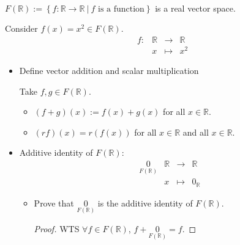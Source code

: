 \documentclass[11pt,fleqn]{book} %
\begin{document}
\begin{example}
{~~~}

    $F(\mathbb{R}) := \left\{ f:\mathbb{R} \to \mathbb{R} ~|~f \text{ is a function} \right\}$ is a real vector space. 
    
    Consider $f(x) = x^2 \in F(\mathbb{R})$. 
    $$\begin{matrix} &f: &\mathbb{R} &\to &\mathbb{R} \\& &x &\mapsto &x^2 \end{matrix}$$
    \begin{center}
    \end{center}
    
    \begin{itemize}
        \item Define vector addition and scalar multiplication
        
        Take $f,g \in F(\mathbb{R})$. 
        \begin{itemize}
            \item $(f+g)(x):=f(x)+g(x)$ for all $x \in \mathbb{R}$.

            \item $(rf)(x)=r\left(f(x)\right)$ for all $x \in \mathbb{R}$ and all $x \in \mathbb{R}$. 
        \end{itemize}
        
        \item Additive identity of $F(\mathbb{R})$:
        $$\begin{matrix} &\underset{F(\mathbb{R})}{0} &\mathbb{R} &\to &\mathbb{R} \\& &x &\mapsto &0_{\mathbb{R}} \end{matrix}$$
        
        \begin{itemize}
            \item Prove that $\underset{F(\mathbb{R})}{0}$ is the additive identity of $F(\mathbb{R})$.
            
            \begin{proof}
                WTS $\forall f \in F(\mathbb{R})$, $f+\underset{F(\mathbb{R})}{0} = f$. 
                

\end{proof}
\end{itemize}
\end{itemize}
\end{example}
\end{document}
